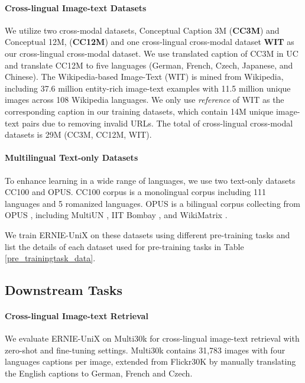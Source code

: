 \documentclass{article}
\begin{document}
\paragraph{Cross-lingual Image-text Datasets}
We utilize two cross-modal datasets, Conceptual Caption 3M (\textbf{CC3M}) and Conceptual 12M, (\textbf{CC12M}) \cite{cc12m} and one cross-lingual cross-modal dataset \textbf{WIT} \cite{wit2021} as our cross-lingual cross-modal dataset. We use translated caption of CC3M in UC \cite{UC22021} and translate CC12M to five languages (German, French, Czech, Japanese, and Chinese). The Wikipedia-based Image-Text (WIT) \cite{wit2021} is mined from Wikipedia, including 37.6 million entity-rich image-text examples with 11.5 million unique images across 108 Wikipedia languages. We only use \textit{reference} of WIT as the corresponding caption in our training datasets, which contain 14M unique image-text pairs due to removing invalid URLs. The total of cross-lingual cross-modal datasets is 29M (CC3M, CC12M, WIT).
\paragraph{Multilingual Text-only Datasets}
To enhance learning in a wide range of languages, we use two text-only datasets CC100 and OPUS. CC100 corpus is a monolingual corpus \cite{wenzek-etal-2020-ccnet} including 111 languages and 5 romanized languages. OPUS is a bilingual corpus collecting from OPUS \cite{opus-2012}, including MultiUN \cite{ziemski-etal-2016-united}, IIT Bombay \cite{kunchukuttan-etal-2018-iit}, and WikiMatrix \cite{wikimatrix}. 

We train ERNIE-UniX on these datasets using different pre-training tasks and list the details of each dataset used for pre-training tasks in Table \ref{pre_trainingtask_data}. 

\subsection{Downstream Tasks}
\paragraph{Cross-lingual Image-text Retrieval}
We evaluate ERNIE-UniX on Multi30k \cite{elliott-etal-2016-multi30k,elliott-EtAl:2017:WMT,barrault2018findings} for cross-lingual image-text retrieval with zero-shot and fine-tuning settings. Multi30k \cite{elliott-etal-2016-multi30k} contains 31,783 images with four languages captions per image, extended from Flickr30K \cite{flicker30K} by manually translating the English captions to German, French and Czech.
\end{document}
